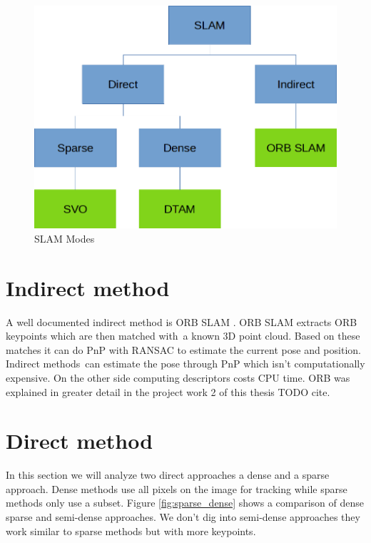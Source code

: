 \documentclass[11pt,a4paper,titlepage,oneside]{report}
\begin{document}
\begin{figure}[H]
  \includegraphics[width=1.0\textwidth]{img/slam_modes.png}
  \caption{SLAM Modes}\label{fig:slammodes}
\end{figure}


\section{Indirect method}

A well documented indirect method is ORB SLAM \cite{orbslam}. ORB SLAM extracts ORB keypoints which are then matched with a known 3D point cloud. Based on these matches it can do PnP with RANSAC \cite{ransac} to estimate the current pose and position. Indirect methods can estimate the pose through PnP which isn’t computationally expensive. On the other side computing descriptors costs CPU time. ORB was explained in greater detail in the project work 2 of this thesis TODO cite.

\section{Direct method}

In this section we will analyze two direct approaches a dense and a sparse approach. Dense methods use all pixels on the image for tracking while sparse methods only use a subset. Figure \ref{fig:sparse_dense} shows a comparison of dense sparse and semi-dense approaches. We don't dig into semi-dense approaches they work similar to sparse methods but with more keypoints.
\end{document}

